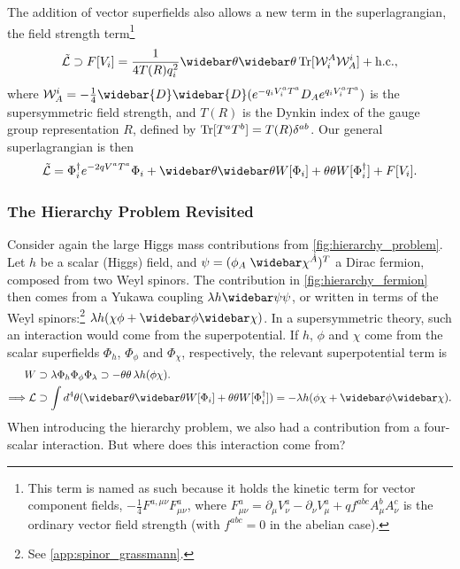 The addition of vector superfields also allows a new term in the superlagrangian, the field strength term\footnote{This term is named as such because it holds the kinetic term for vector component fields, $-\frac{1}{4}F^{a,\mu\nu}F^a_{\mu\nu}$, where $F^a_{\mu\nu}=\partial_\mu V^a_\nu - \partial_\nu V^a_\mu + qf^{abc}A^b_\mu A^c_\nu$ is the ordinary vector field strength (with $f^{abc}=0$ in the abelian case).}
\begin{equation}\label{eq:susy_field_strength_term}
    \tilde{\mathcal{L}} \supset
    F[V_i] = \frac{1}{4T(R)q_i^2} \thetabartwo \Tr[\mathcal{W}_i^A\mathcal{W}^i_A]
    + \text{h.c.},
\end{equation}
where $\mathcal{W}^i_A = -\frac{1}{4}\widebar{D}\widebar{D}(e^{-q_iV_i^aT^a}D_Ae^{q_iV_i^aT^a})$ is the supersymmetric field strength, and $T(R)$ is the Dynkin index of the gauge group representation $R$, defined by $\operatorname{Tr}[T^aT^b]=T(R)\delta^{ab}$.
Our general superlagrangian is then
\begin{equation}\label{eq:general_superlagrangian}
    \tilde{\mathcal{L}} = \Phi_i^\dagger e^{-2qV^aT^a}\Phi_i + \thetabartwo W[\Phi_i] + \thetatwo W[\Phi_i^\dagger] + F[V_i].
\end{equation}



\subsubsection{The Hierarchy Problem Revisited}
Consider again the large Higgs mass contributions from \cref{fig:hierarchy_problem}. Let $h$ be a scalar (Higgs) field, and $\psi = (\phi_A \; \widebar\chi^{\dot{A}})^T$ a Dirac fermion, composed from two Weyl spinors.
The contribution in \cref{fig:hierarchy_fermion} then comes from a Yukawa coupling $\lambda h\widebar\psi\psi$, or written in terms of the Weyl spinors:\footnote{See \cref{app:spinor_grassmann}.} $\lambda h(\chi\phi + \widebar\phi\widebar\chi)$.
In a supersymmetric theory, such an interaction would come from the superpotential. If $h$, $\phi$ and $\chi$ come from the scalar superfields $\Phi_h$, $\Phi_\phi$ and $\Phi_\chi$, respectively, the relevant superpotential term is
\begin{align}
    W &\supset \lambda \Phi_h \Phi_\phi \Phi_\lambda \supset - \thetatwo \, \lambda h(\phi\chi).
    \nonumber \\
    \Longrightarrow \mathcal{L} &\supset \int d^4\theta (\thetabartwo W[\Phi_i] + \thetatwo W[\Phi_i^\dagger])
    = -\lambda h (\phi\chi + \widebar\phi\widebar\chi).
\end{align}
When introducing the hierarchy problem, we also had a contribution from a four-scalar interaction. But where does this interaction come from?

